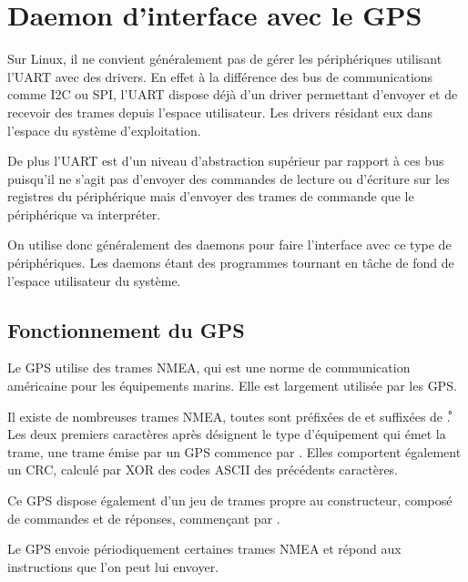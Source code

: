 \chapter{Daemon d'interface avec le GPS}

Sur Linux, il ne convient généralement pas de gérer les périphériques utilisant l'UART avec des drivers. En effet à la différence des bus de communications comme I2C ou SPI, l'UART dispose déjà d'un driver permettant d'envoyer et de recevoir des trames depuis l'espace utilisateur. Les drivers résidant eux dans l'espace du système d'exploitation.

De plus l'UART est d'un niveau d'abstraction supérieur par rapport à ces bus puisqu'il ne s'agit pas d'envoyer des commandes de lecture ou d'écriture sur les registres du périphérique mais d'envoyer des trames de commande que le périphérique va interpréter.

\vspace{1cm}

On utilise donc généralement des daemons pour faire l'interface avec ce type de périphériques. Les daemons étant des programmes tournant en tâche de fond de l'espace utilisateur du système.

\section{Fonctionnement du GPS}

Le GPS utilise des trames NMEA, qui est une norme de communication américaine pour les équipements marins. Elle est largement utilisée par les GPS.

\vspace{1cm}

Il existe de nombreuses trames NMEA, toutes sont préfixées de  et suffixées de \texttt{\r\n}. Les deux premiers caractères après  désignent le type d'équipement qui émet la trame, une trame émise par un GPS commence par . Elles comportent également un CRC, calculé par XOR des codes ASCII des précédents caractères.

Ce GPS dispose également d'un jeu de trames propre au constructeur, composé de commandes et de réponses, commençant par .

\vspace{1cm}

Le GPS envoie périodiquement certaines trames NMEA et répond aux instructions que l'on peut lui envoyer.


